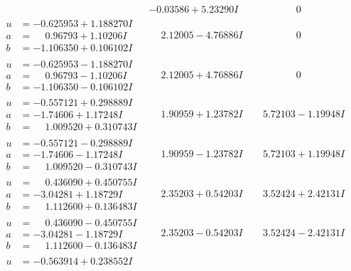 \documentclass[1p]{elsarticle_modified}
\theoremstyle{definition}
\begin{document}
$$\begin{array}{c|c|c}
 & -0.03586 + 5.23290 I & \phantom{-0.000000 } 0 \\ \hline\begin{aligned}
u &= -0.625953 + 1.188270 I \\
a &= \phantom{-}0.96793 + 1.10206 I \\
b &= -1.106350 + 0.106102 I\end{aligned}
 & \phantom{-}2.12005 - 4.76886 I & \phantom{-0.000000 } 0 \\ \hline\begin{aligned}
u &= -0.625953 - 1.188270 I \\
a &= \phantom{-}0.96793 - 1.10206 I \\
b &= -1.106350 - 0.106102 I\end{aligned}
 & \phantom{-}2.12005 + 4.76886 I & \phantom{-0.000000 } 0 \\ \hline\begin{aligned}
u &= -0.557121 + 0.298889 I \\
a &= -1.74606 + 1.17248 I \\
b &= \phantom{-}1.009520 + 0.310743 I\end{aligned}
 & \phantom{-}1.90959 + 1.23782 I & \phantom{-}5.72103 - 1.19948 I \\ \hline\begin{aligned}
u &= -0.557121 - 0.298889 I \\
a &= -1.74606 - 1.17248 I \\
b &= \phantom{-}1.009520 - 0.310743 I\end{aligned}
 & \phantom{-}1.90959 - 1.23782 I & \phantom{-}5.72103 + 1.19948 I \\ \hline\begin{aligned}
u &= \phantom{-}0.436090 + 0.450755 I \\
a &= -3.04281 + 1.18729 I \\
b &= \phantom{-}1.112600 + 0.136483 I\end{aligned}
 & \phantom{-}2.35203 + 0.54203 I & \phantom{-}3.52424 + 2.42131 I \\ \hline\begin{aligned}
u &= \phantom{-}0.436090 - 0.450755 I \\
a &= -3.04281 - 1.18729 I \\
b &= \phantom{-}1.112600 - 0.136483 I\end{aligned}
 & \phantom{-}2.35203 - 0.54203 I & \phantom{-}3.52424 - 2.42131 I \\ \hline\begin{aligned}
u &= -0.563914 + 0.238552 I \\

\end{aligned}
\end{array}$$
\end{document}
